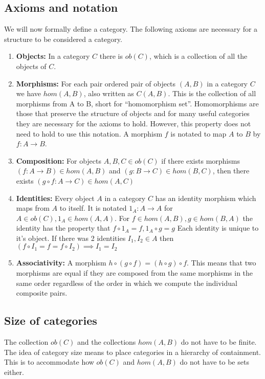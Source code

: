 \documentclass[10pt,a4paper,reqno]{amsart}
\begin{document}
\subsection{Axioms and notation}
We will now formally define a category. The following axioms are necessary for a
structure to be considered a category.
\begin{enumerate}
        \item \textbf{Objects:} In a category $C$ there is $ob(C)$, which is a
        collection of all the objects of $C$.

        \item \textbf{Morphisms:} For each pair ordered pair of objects $(A,B)$
        in a category $C$ we have $hom(A,B)$, also written as $C(A,B)$.  This is
        the collection of all morphisms from A to B, short for ``homomorphism
        set''.  Homomorphisms are those that preserve the structure of objects
        and for many useful categories they are necessary for the axioms to
        hold.  However, this property does not need to hold to use this
        notation.  A morphism $f$ is notated to map $A$ to $B$ by $f: A\to B$.

        \item \textbf{Composition:} For objects $A,B,C\in ob(C)$ if there exists
        morphisms $(f: A\to B)\in hom(A,B)$ and $(g: B\to C)\in hom(B,C)$, then
        there exists $(g\circ f: A\to C)\in hom(A,C)$

        \item \textbf{Identities:} Every object $A$ in a category $C$ has an
        identity morphism which maps from $A$ to itself.  It is notated $1_A:
        A\to A$ for $A\in ob(C), 1_A\in hom(A,A)$.  For $f\in hom(A,B), g\in
        hom(B,A)$ the identity has the property that $f\circ 1_A = f, 1_A\circ g
        = g$ Each identity is unique to it's object. If there was 2 identities
        $I_1,I_2\in A$ then $(f\circ I_1 = f = f\circ I_2) \implies I_1=I_2$

        \item \textbf{Associativity:} A morphism $h\circ(g\circ f) = (h\circ
        g)\circ f$.  This means that two morphisms are equal if they are
        composed from the same morphisms in the same order regardless of the
        order in which we compute the individual composite pairs.
\end{enumerate}

\subsection{Size of categories}
The collection $ob(C)$ and the collections $hom(A,B)$ do not have to be finite.
The idea of category size means to place categories in a hierarchy of
containment. This is to accommodate how $ob(C)$ and $hom(A,B)$ do not have to be
sets either.
\end{document}

